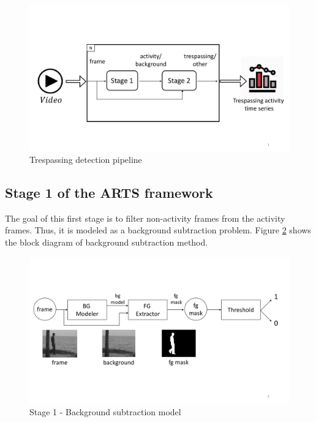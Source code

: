 \begin{figure}
    \centering
    \includegraphics[width=\linewidth,trim={0 110 0 130},clip]{images/trespassing-detection-pipeline}
    \caption{Trespassing detection pipeline}
    \label{fig:trespassing-detection-pipeline}
\end{figure}


\subsection{Stage 1 of the ARTS framework}
\label{sec:stage1}
The goal of this first stage is to filter non-activity frames from the activity frames. Thus, it is modeled as a background subtraction problem. Figure \ref{fig:background-subtraction-model} shows the block diagram of background subtraction method. 
\begin{figure}
    \centering
    \includegraphics[width=\linewidth,trim={0 130 0 130},clip]{images/background-subtraction-model}
    \caption{Stage 1 - Background subtraction model}
    \label{fig:background-subtraction-model}
\end{figure}

